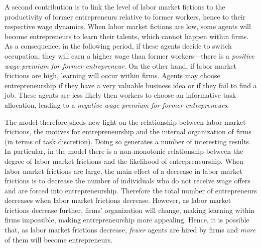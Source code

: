 \documentclass[12pt,american]{paper}
\theoremstyle{remark}
\begin{document}
A second contribution is to link the level of labor market fictions to the productivity of former entrepreneurs relative to former workers, hence to their respective wage dynamics. When labor market fictions are low, some agents will become entrepreneurs to learn their talents, which cannot happen within firms. As a consequence, in the following period, if these agents decide to switch occupation, they will earn a higher wage than former workers---there is a \textit{positive wage premium for former entrepreneur}. On the other hand, if labor market frictions are high, learning will occur within firms. Agents may choose entrepreneurship if they have a very valuable business idea or if they fail to find a job. These agents are less likely then workers to choose an informative task allocation, leading to a \textit{negative wage premium for former entrepreneurs}.%

The model therefore sheds new light on the relationship between labor market frictions, the motives for entrepreneurship and the internal organization of firms (in terms of task discretion). Doing so generates a number of interesting results. In particular, in the model there is a non-monotonic relationship between the degree of labor market frictions and the likelihood of entrepreneurship. When labor market frictions are large, the main effect of a decrease in labor market frictions is to decrease the number of individuals who do not receive wage offers and are forced into entrepreneurship. Therefore the total number of entrepreneurs decreases when labor market frictions decrease. However, as labor market frictions decrease further, firms' organization will change, making learning within firms impossible, making entrepreneurship more appealing. Hence, it is possible that, as labor market frictions decrease,  \emph{fewer} agents are hired by firms and \textit{more} of them will become entrepreneurs.  
\end{document}
